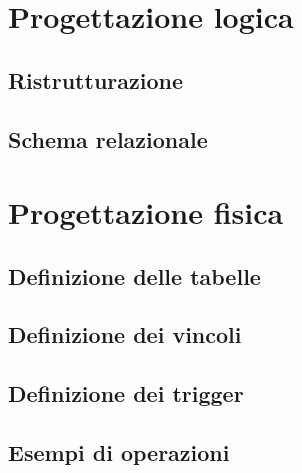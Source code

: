 \chapter{Progettazione logica}

\section{Ristrutturazione}

\section{Schema relazionale}

\chapter{Progettazione fisica}

\section{Definizione delle tabelle}

\section{Definizione dei vincoli}

\section{Definizione dei trigger}

\section{Esempi di operazioni}